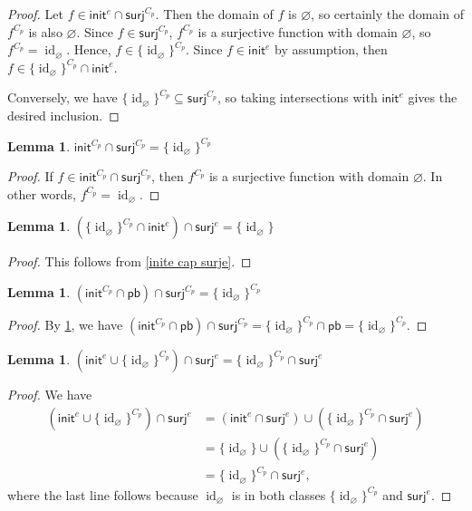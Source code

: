\documentclass{amsart}
\renewcommand\emptyset\varnothing
\newcommand{\surj}{\mathsf{surj}}
\newcommand{\init}{\mathsf{init}}
\newcommand{\pb}{\mathsf{pb}}
\DeclareMathOperator{\id}{id}
\numberwithin{equation}{section}
\newtheorem{lemma}[equation]{Lemma}
\theoremstyle{definition}
\begin{document}
\begin{proof}
	Let $f \in \init^e \cap \surj^{C_p}$. Then the domain of $f$ is $\emptyset$, so certainly the domain of $f^{C_p}$ is also $\emptyset$. Since $f \in \surj^{C_p}$, $f^{C_p}$ is a surjective function with domain $\emptyset$, so $f^{C_p} = \id_\emptyset$. Hence, $f \in \{\id_\emptyset\}^{C_p}$. Since $f \in \init^e$ by assumption, then $f \in \{\id_\emptyset\}^{C_p} \cap \init^e$.

	Conversely, we have $\{\id_\emptyset\}^{C_p} \subseteq \surj^{C_p}$, so taking intersections with $\init^e$ gives the desired inclusion.
\end{proof}
\begin{lemma}
	\label{initCp cap surjCp}
	$\init^{C_p} \cap \surj^{C_p} = \{\id_\emptyset\}^{C_p}$
\end{lemma}

\begin{proof}
	If $f \in \init^{C_p} \cap \surj^{C_p}$, then $f^{C_p}$ is a surjective function with domain $\emptyset$. In other words, $f^{C_p} = \id_\emptyset$.
\end{proof}
\begin{lemma}
	\label{(idemptyCp cap inite) cap surje}
	$\left(\{\id_\emptyset\}^{C_p} \cap \init^e\right) \cap \surj^e = \{\id_\emptyset\}$
\end{lemma}

\begin{proof}
	This follows from \cref{inite cap surje}.
\end{proof}
\begin{lemma}
	\label{(initCp cap pb) cap surjCp}
	$\left(\init^{C_p} \cap \pb \right) \cap \surj^{C_p} = \{\id_\emptyset\}^{C_p}$
\end{lemma}

\begin{proof}
	By \cref{initCp cap surjCp}, we have
	\(
	\left(\init^{C_p} \cap \pb \right) \cap \surj^{C_p} = \{\id_\emptyset\}^{C_p} \cap \pb = \{\id_\emptyset\}^{C_p}.
	\)
\end{proof}
\begin{lemma}
	\label{(inite cup idemptyCp) cap surje}
	$\left(\init^e \cup \{\id_\emptyset\}^{C_p} \right) \cap \surj^e = \{\id_\emptyset\}^{C_p} \cap \surj^e$
\end{lemma}

\begin{proof}
	We have
	\begin{align*}
		\left(\init^e \cup \{\id_\emptyset\}^{C_p} \right) \cap \surj^e
		 & =
		\left(\init^e \cap \surj^e \right) \cup \left(\{\id_\emptyset\}^{C_p} \cap \surj^e\right)
		\\
		 & =
		\{\id_\emptyset\} \cup \left(\{\id_\emptyset\}^{C_p} \cap \surj^e\right)
		\\
		 & =
		\{\id_\emptyset\}^{C_p} \cap \surj^e,
	\end{align*}
	where the last line follows because $\id_\emptyset$ is in both classes $\{\id_\emptyset\}^{C_p}$ and $\surj^e$.
\end{proof}
\end{document}
